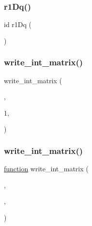 \subsubsection{\texorpdfstring{r1\+Dq()}{r1Dq()}}
{\footnotesize\ttfamily id r1\+Dq (\begin{DoxyParamCaption}{ }\end{DoxyParamCaption})\hspace{0.3cm}{\ttfamily [virtual]}}

\mbox{\label{a01014_a30e0c8956141cd77f6fd8ec4c5e9c80e}} 
\subsubsection{\texorpdfstring{write\+\_\+int\+\_\+matrix()}{write\_int\_matrix()}\hspace{0.1cm}{\footnotesize\ttfamily [1/2]}}
{\footnotesize\ttfamily write\+\_\+int\+\_\+matrix (\begin{DoxyParamCaption}\item[{\hyperlink{a00473_ae0527cbfd56392d5095a691bbf10ba5b}{f\+ID}}]{,  }\item[{\hyperlink{a00575_a53fedbe0b7d30bbdae17dd4984fb3177}{Fmask}\textquotesingle{}-\/}]{1,  }\item[{\textquotesingle{}\hyperlink{a00575_a53fedbe0b7d30bbdae17dd4984fb3177}{Fmask}\textquotesingle{}}]{ }\end{DoxyParamCaption})}

\mbox{\label{a01014_af8d48bee9b0665b9de55de22c6fd4a2b}} 
\subsubsection{\texorpdfstring{write\+\_\+int\+\_\+matrix()}{write\_int\_matrix()}\hspace{0.1cm}{\footnotesize\ttfamily [2/2]}}
{\footnotesize\ttfamily \hyperlink{a00611_a2420833d971716e9bab41cc9fb3abba1}{function} write\+\_\+int\+\_\+matrix (\begin{DoxyParamCaption}\item[{\hyperlink{a00473_ae0527cbfd56392d5095a691bbf10ba5b}{f\+ID}}]{,  }\item[{A}]{,  }\item[{name}]{ }\end{DoxyParamCaption})}

